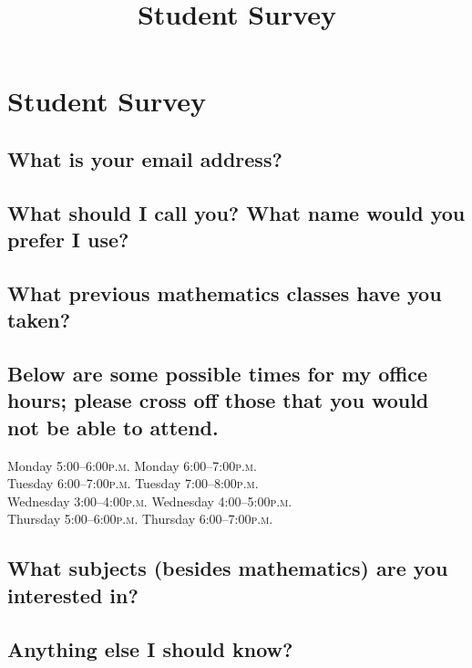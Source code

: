 \documentclass[12pt]{article}
\title{Student Survey}
\newcommand{\peem}{\textsc{p.m.}}
\begin{document}
\section*{Student Survey}

\subsection*{What is your email address?}
\vfill

\subsection*{What should I call you?  What name would you prefer I use?}
\vfill

\subsection*{What previous mathematics classes have you taken?}
\vfill



\subsection*{Below are some possible times for my office hours; please cross off those that you would not be able to attend.}

\begin{center}
\null\hfill
Monday 5:00--6:00\peem \hfill
Monday 6:00--7:00\peem 
\hfill\null\\
\null\hfill
Tuesday 6:00--7:00\peem \hfill
Tuesday 7:00--8:00\peem
\hfill\null\\
\null\hfill
Wednesday 3:00--4:00\peem \hfill
Wednesday 4:00--5:00\peem
\hfill\null\\
\null\hfill
Thursday 5:00--6:00\peem \hfill
Thursday 6:00--7:00\peem
\hfill\null\\
\end{center}

\vfill



\subsection*{What subjects (besides mathematics) are you interested in?}
\vfill

\subsection*{Anything else I should know?}
\vfill
\end{document}
